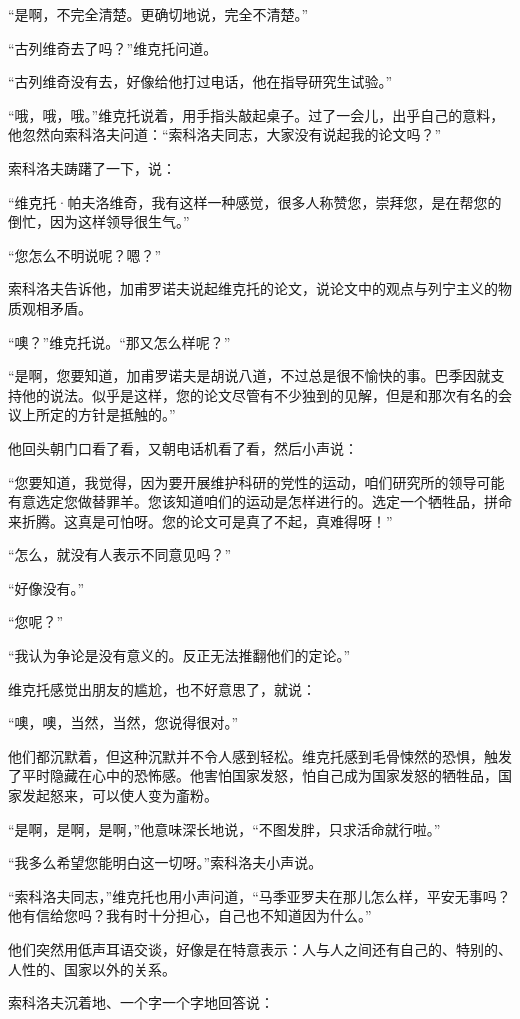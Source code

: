 “是啊，不完全清楚。更确切地说，完全不清楚。”

“古列维奇去了吗？”维克托问道。

“古列维奇没有去，好像给他打过电话，他在指导研究生试验。”

“哦，哦，哦。”维克托说着，用手指头敲起桌子。过了一会儿，出乎自己的意料，他忽然向索科洛夫问道：“索科洛夫同志，大家没有说起我的论文吗？”

索科洛夫踌躇了一下，说：

“维克托·帕夫洛维奇，我有这样一种感觉，很多人称赞您，崇拜您，是在帮您的倒忙，因为这样领导很生气。”

“您怎么不明说呢？嗯？”

索科洛夫告诉他，加甫罗诺夫说起维克托的论文，说论文中的观点与列宁主义的物质观相矛盾。

“噢？”维克托说。“那又怎么样呢？”

“是啊，您要知道，加甫罗诺夫是胡说八道，不过总是很不愉快的事。巴季因就支持他的说法。似乎是这样，您的论文尽管有不少独到的见解，但是和那次有名的会议上所定的方针是抵触的。”

他回头朝门口看了看，又朝电话机看了看，然后小声说：

“您要知道，我觉得，因为要开展维护科研的党性的运动，咱们研究所的领导可能有意选定您做替罪羊。您该知道咱们的运动是怎样进行的。选定一个牺牲品，拼命来折腾。这真是可怕呀。您的论文可是真了不起，真难得呀！”

“怎么，就没有人表示不同意见吗？”

“好像没有。”

“您呢？”

“我认为争论是没有意义的。反正无法推翻他们的定论。”

维克托感觉出朋友的尴尬，也不好意思了，就说：

“噢，噢，当然，当然，您说得很对。”

他们都沉默着，但这种沉默并不令人感到轻松。维克托感到毛骨悚然的恐惧，触发了平时隐藏在心中的恐怖感。他害怕国家发怒，怕自己成为国家发怒的牺牲品，国家发起怒来，可以使人变为齑粉。

“是啊，是啊，是啊，”他意味深长地说，“不图发胖，只求活命就行啦。”

“我多么希望您能明白这一切呀。”索科洛夫小声说。

“索科洛夫同志，”维克托也用小声问道，“马季亚罗夫在那儿怎么样，平安无事吗？他有信给您吗？我有时十分担心，自己也不知道因为什么。”

他们突然用低声耳语交谈，好像是在特意表示：人与人之间还有自己的、特别的、人性的、国家以外的关系。

索科洛夫沉着地、一个字一个字地回答说：

